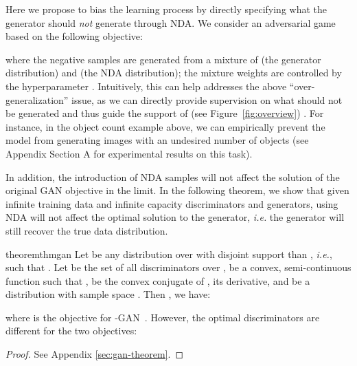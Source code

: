 \documentclass{article} \usepackage{iclr2021_conference,times}
\begin{document}
Here we propose to bias the learning process
by directly specifying what the generator should \textit{not} generate through NDA. 
We consider an adversarial game based on the following objective:

where the negative samples are generated from a mixture of  (the generator distribution) and  (the NDA distribution); the mixture weights are controlled by the hyperparameter . 
Intuitively, this can help addresses the above ``over-generalization'' issue, as we can directly provide supervision on what should not be generated and thus guide the support of  (see Figure~\ref{fig:overview}) . For instance, in the object count example above, 
we can empirically prevent the model from generating images with an undesired number of objects (see Appendix Section A for experimental results on this task). 













In addition, the introduction of NDA samples will not affect the solution of the original GAN objective in the limit.
In the following theorem, we show that given infinite training data and infinite capacity discriminators and generators, using NDA will not affect the optimal solution to the generator, \textit{i.e.} the generator will still recover the true data distribution. 


\begin{restatable}{theorem}{thmgan}
Let  be any distribution over  with disjoint support than , \textit{i.e.}, such that . Let  be the set of all discriminators over ,  be a convex, semi-continuous function such that ,  be the convex conjugate of ,  its derivative, and  be a distribution with sample space . Then , we have:

where  is the objective for -GAN~\citep{nowozin2016f}. However, the optimal discriminators are different for the two objectives:

\end{restatable}
\begin{proof}
See Appendix \ref{sec:gan-theorem}.
\end{proof}
\end{document}

